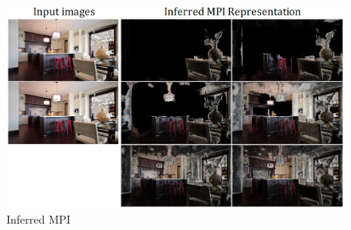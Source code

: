 \begin{figure}[!h]
    \includegraphics[width=1\columnwidth]{figures/inferred-mpi.png}
    \caption{Inferred MPI~\cite{zhou2018stereo}}
    \label{fig:inferred-mpi}
\end{figure}

